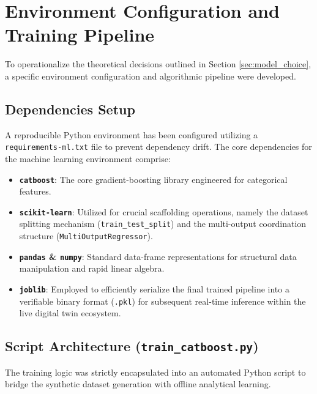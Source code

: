 \documentclass[11pt,a4paper]{article}
\begin{document}
\section{Environment Configuration and Training Pipeline}
\label{sec:env_configuration}

To operationalize the theoretical decisions outlined in Section \ref{sec:model_choice}, a specific environment configuration and algorithmic pipeline were developed.

\subsection{Dependencies Setup}
A reproducible Python environment has been configured utilizing a \texttt{requirements-ml.txt} file to prevent dependency drift. The core dependencies for the machine learning environment comprise:
\begin{itemize}
    \item \textbf{\texttt{catboost}}: The core gradient-boosting library engineered for categorical features.
    \item \textbf{\texttt{scikit-learn}}: Utilized for crucial scaffolding operations, namely the dataset splitting mechanism (\texttt{train\_test\_split}) and the multi-output coordination structure (\texttt{MultiOutputRegressor}).
    \item \textbf{\texttt{pandas} \& \textbf{\texttt{numpy}}}: Standard data-frame representations for structural data manipulation and rapid linear algebra.
    \item \textbf{\texttt{joblib}}: Employed to efficiently serialize the final trained pipeline into a verifiable binary format (\texttt{.pkl}) for subsequent real-time inference within the live digital twin ecosystem.
\end{itemize}

\subsection{Script Architecture (\texttt{train\_catboost.py})}
The training logic was strictly encapsulated into an automated Python script to bridge the synthetic dataset generation with offline analytical learning.
\end{document}
